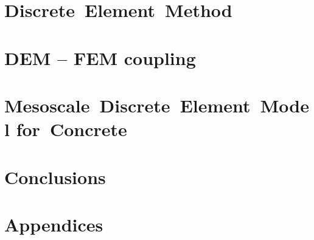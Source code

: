 \documentclass[%
]{phdthesis}
\begin{document}
	\headingNonumber
	
	\blankpage
	\cleardoublepage
	\headingNormal
	
	\part{Discrete~Element~Method}\label{partDEM}
	
	
	
	\part{DEM -- FEM coupling}\label{partCoupling}
	
	\part{Mesoscale~Discrete~Element~Model for~Concrete}\label{partMeso}
	
	\part{Conclusions}\label{partConclusions}
	
	\headingNonumber
	
	\cleardoublepageempty
	\headingNormal
	\appendix
	\part{Appendices}\label{partAppendices}
	
	
\end{document}
